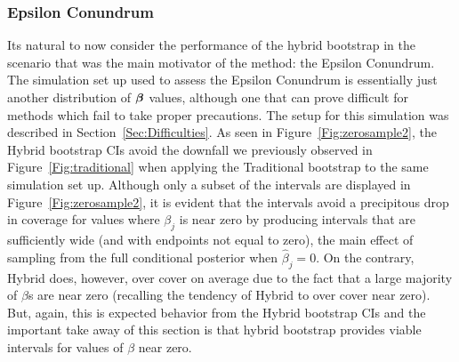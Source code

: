 \subsubsection{Epsilon Conundrum}\label{Sec:Epsilon}


Its natural to now consider the performance of the hybrid bootstrap in the scenario that was the main motivator of the method: the Epsilon Conundrum. The simulation set up used to assess the Epsilon Conundrum is essentially just another distribution of $\boldsymbol{\beta}$ values, although one that can prove difficult for methods which fail to take proper precautions. The setup for this simulation was described in Section~\ref{Sec:Difficulties}. As seen in Figure~\ref{Fig:zerosample2}, the Hybrid bootstrap CIs avoid the downfall we previously observed in Figure~\ref{Fig:traditional} when applying the Traditional bootstrap to the same simulation set up. Although only a subset of the intervals are displayed in Figure~\ref{Fig:zerosample2}, it is evident that the intervals avoid a precipitous drop in coverage for values where $\beta_j$ is near zero by producing intervals that are sufficiently wide (and with endpoints not equal to zero), the main effect of sampling from the full conditional posterior when $\hat{\beta}_j = 0$. On the contrary, Hybrid does, however, over cover on average due to the fact that a large majority of $\beta$s are near zero (recalling the tendency of Hybrid to over cover near zero). But, again, this is expected behavior from the Hybrid bootstrap CIs and the important take away of this section is that hybrid bootstrap provides viable intervals for values of $\beta$ near zero.



